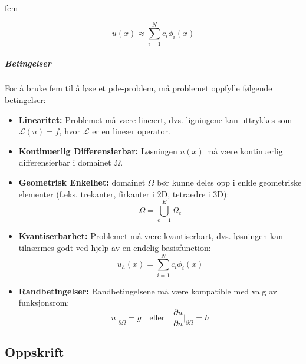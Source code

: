 \chapter{}

\glsdesc{fem}

\begin{equation}
  u(x) \approx \sum_{i=1}^N c_i \phi_i(x)
\end{equation}

\paragraph{Betingelser}

For å bruke \gls{fem} til å løse et \gls{pde}-problem, må problemet oppfylle følgende betingelser:

\begin{itemize}
  \item \textbf{Linearitet:} Problemet må være lineært, dvs. ligningene kan uttrykkes som \(\mathcal{L}(u) = f\), hvor \(\mathcal{L}\) er en lineær operator.
  \item \textbf{Kontinuerlig Differensierbar:} Løsningen \( u(x) \) må være kontinuerlig differensierbar i \gls{domain}et \( \Omega \).
  \item \textbf{Geometrisk Enkelhet:} \gls{domain}et \( \Omega \) bør kunne deles opp i enkle geometriske elementer (f.eks. trekanter, firkanter i 2D, tetraedre i 3D):
        \[
          \Omega = \bigcup_{e=1}^{E} \Omega_e
        \]
  \item \textbf{Kvantiserbarhet:} Problemet må være kvantiserbart, dvs. løsningen kan tilnærmes godt ved hjelp av en endelig \gls{basisfunction}:
        \[
          u_h(x) = \sum_{i=1}^{N} c_i \phi_i(x)
        \]
  \item \textbf{Randbetingelser:} Randbetingelsene må være kompatible med valg av funksjonsrom:
        \[
          u|_{\partial \Omega} = g \quad \text{eller} \quad \frac{\partial u}{\partial n}\bigg|_{\partial \Omega} = h
        \]
\end{itemize}

\section{Oppskrift}

